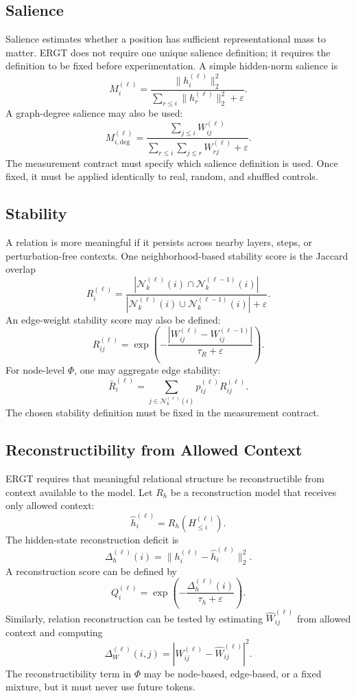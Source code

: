 \documentclass[11pt]{article}
\begin{document}
\subsection{Salience}

Salience estimates whether a position has sufficient representational mass to matter. ERGT does not require one unique salience definition; it requires the definition to be fixed before experimentation. A simple hidden-norm salience is
\[
M_i^{(\ell)}
=
\frac{\|h_i^{(\ell)}\|_2^2}{\sum_{r\leq i}\|h_r^{(\ell)}\|_2^2+\varepsilon}.
\]
A graph-degree salience may also be used:
\[
M_{i,\mathrm{deg}}^{(\ell)}
=
\frac{\sum_{j\leq i}W_{ij}^{(\ell)}}{\sum_{r\leq i}\sum_{j\leq r}W_{rj}^{(\ell)}+\varepsilon}.
\]
The measurement contract must specify which salience definition is used. Once fixed, it must be applied identically to real, random, and shuffled controls.

\subsection{Stability}

A relation is more meaningful if it persists across nearby layers, steps, or perturbation-free contexts. One neighborhood-based stability score is the Jaccard overlap
\[
R_i^{(\ell)}
=
\frac{
|\mathcal{N}_k^{(\ell)}(i)\cap\mathcal{N}_k^{(\ell-1)}(i)|
}{
|\mathcal{N}_k^{(\ell)}(i)\cup\mathcal{N}_k^{(\ell-1)}(i)|+\varepsilon
}.
\]
An edge-weight stability score may also be defined:
\[
R_{ij}^{(\ell)}
=
\exp\left(-\frac{|W_{ij}^{(\ell)}-W_{ij}^{(\ell-1)}|}{\tau_R+\varepsilon}\right).
\]
For node-level $\Phi$, one may aggregate edge stability:
\[
\bar{R}_i^{(\ell)}
=
\sum_{j\in\mathcal{N}_k^{(\ell)}(i)}p_{ij}^{(\ell)}R_{ij}^{(\ell)}.
\]
The chosen stability definition must be fixed in the measurement contract.

\subsection{Reconstructibility from Allowed Context}

ERGT requires that meaningful relational structure be reconstructible from context available to the model. Let $R_h$ be a reconstruction model that receives only allowed context:
\[
\widehat{h}_i^{(\ell)}=R_h(H_{\leq i}^{(\ell)}).
\]
The hidden-state reconstruction deficit is
\[
\Delta_h^{(\ell)}(i)=\|h_i^{(\ell)}-\widehat{h}_i^{(\ell)}\|_2^2.
\]
A reconstruction score can be defined by
\[
Q_i^{(\ell)}=\exp\left(-\frac{\Delta_h^{(\ell)}(i)}{\tau_h+\varepsilon}\right).
\]
Similarly, relation reconstruction can be tested by estimating $\widehat{W}_{ij}^{(\ell)}$ from allowed context and computing
\[
\Delta_W^{(\ell)}(i,j)=|W_{ij}^{(\ell)}-\widehat{W}_{ij}^{(\ell)}|^2.
\]
The reconstructibility term in $\Phi$ may be node-based, edge-based, or a fixed mixture, but it must never use future tokens.
\end{document}
